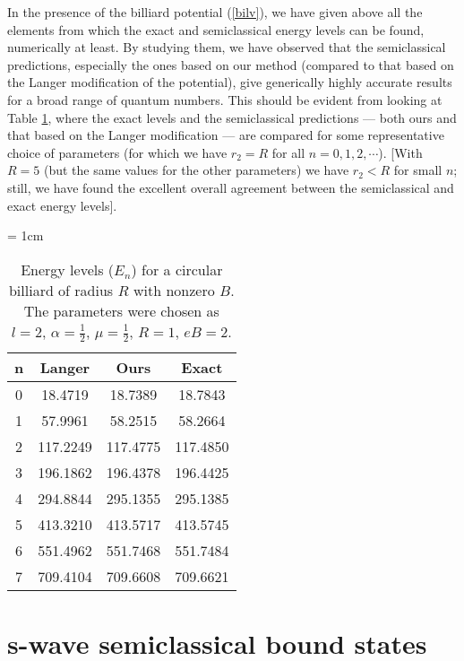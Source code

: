 \documentclass[a4paper,aps,eqsecnum,preprint,preprintnumbers,12pt]{revtex4}
\begin{document}
In the presence of the billiard potential (\ref{bilv}), we have
given above all the elements from which the exact and
semiclassical energy levels can be found, numerically at least. By
studying them, we have observed that the semiclassical
predictions, especially the ones based on our method (compared to
that based on the Langer modification of the potential), give
generically highly accurate results for a broad range of quantum
numbers. This should be evident from looking at Table \ref{tab1},
where the exact levels and the semiclassical predictions --- both
ours and that based on the Langer modification --- are compared
for some representative choice of parameters (for which we have
$r_{2}=R$ for all $n = 0, 1, 2, \cdots$). [With $R=5$ (but the
same values for the other parameters) we have $r_{2}<R$ for small
$n$; still, we have found the excellent overall agreement between
the semiclassical and exact energy levels].
\begin{table}[t]
\caption{Energy levels ($E_{n}$) for a circular billiard of radius
$R$ with nonzero $B$. The parameters were chosen as $l=2$, $\alpha
= \displaystyle \frac{1}{2}$, $\mu = \displaystyle \frac{1}{2}$,
$R=1$, $eB=2$. \label{tab1}}
\begin{center}
\tabcolsep = 1cm
\begin{tabular}{c|ccc}
\hline \hline n & Langer & Ours & Exact \\ \hline
0 & 18.4719 & 18.7389 & 18.7843 \\
1 & 57.9961 & 58.2515 & 58.2664 \\
2 & 117.2249 & 117.4775 & 117.4850 \\
3 & 196.1862 & 196.4378 & 196.4425 \\
4 & 294.8844 & 295.1355 & 295.1385 \\
5 & 413.3210 & 413.5717 & 413.5745 \\
6 & 551.4962 & 551.7468 & 551.7484 \\
7 & 709.4104 & 709.6608 & 709.6621 \\ \hline \hline
\end{tabular}
\end{center}
\end{table}

\section{s-wave semiclassical bound states}
\end{document}
